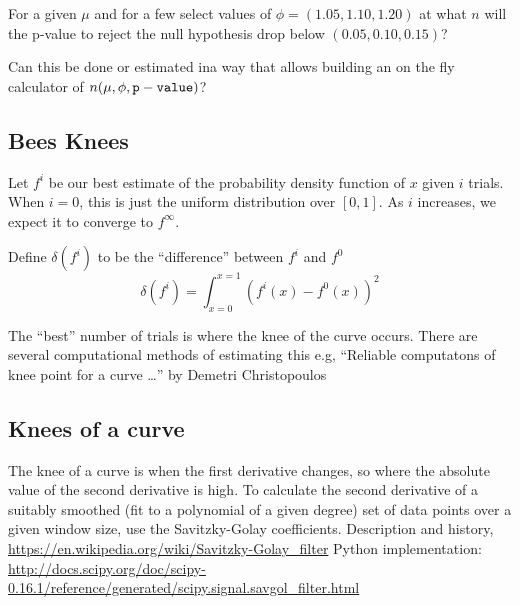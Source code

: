 \documentclass[12pt]{report}
\newcommand{\bdm}{\begin{displaymath}} %
\newcommand{\edm}{\end{displaymath}} %
\begin{document}
For a given \(\mu\) and for a few select values of
\(\phi = (1.05, 1.10, 1.20)\) at what \(n\) will the p-value to reject the null
hypothesis drop below \((0.05, 0.10, 0.15)\)?

Can this be done or estimated ina way that allows building an on the fly
calculator of \(n(\mu, \phi, {\tt p-value})\)?

\subsection{Bees Knees}
Let \(f^i\) be our best estimate of the probability density function
of \(x\) given \(i\) trials. When \(i=0\), this is just the uniform
distribution over \([0, 1]\). As \(i\) increases, we expect it to
converge to \(f^{\infty}\). 

Define \(\delta(f^i)\) to be the ``difference'' between \(f^i\) and
\(f^0\)
\bdm
\delta(f^i) = \int_{x=0}^{x=1} ( f^i(x) - f^0(x) ) ^2
\edm

The ``best'' number of trials is where the knee of the curve
occurs. There are several computational methods of estimating this
e.g, ``Reliable computatons of knee point for a curve \ldots'' by
Demetri Christopoulos

\subsection{Knees of a curve}
The knee of a curve is when the first derivative changes, so where the
absolute value of the second derivative is high. To calculate the second
derivative of a suitably smoothed (fit to a polynomial of a given degree)
set of data points over a given window size, use the Savitzky-Golay
coefficients. Description and history,
\url{https://en.wikipedia.org/wiki/Savitzky-Golay_filter}
Python implementation: \url{http://docs.scipy.org/doc/scipy-0.16.1/reference/generated/scipy.signal.savgol_filter.html}
\end{document}
